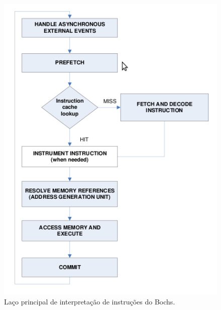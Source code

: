 \documentclass[11pt,twoside]{article}
\begin{document}
\begin{figure}[!h]
  	\begin{center}
    	\includegraphics[scale=0.5]{figures/bochs_loop.png}
	\end{center}
	\caption{Laço principal de interpretação de instruções do Bochs.}
	\label{fig:bochs_loop}
\end{figure}
\end{document}
